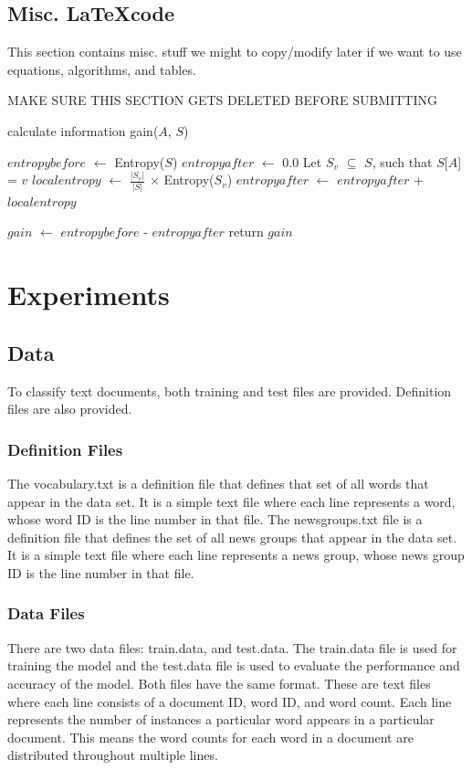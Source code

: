 \documentclass{IEEEtran}
\begin{document}
\subsection{Misc. \LaTeX code}
This section contains misc. stuff we might to copy/modify later if we want to use equations, algorithms, and tables.

MAKE SURE THIS SECTION GETS DELETED BEFORE SUBMITTING

\begin{algorithm}
\caption{calculate information gain($A$, $S$)}
\begin{algorithmic}
\Statex{}
\State $entropybefore$ $\leftarrow$ Entropy($S$)
\State $entropyafter$ $\leftarrow$ 0.0
  \State Let $S_v$ $\subseteq$ $S$, such that $S$[$A$] = $v$
  \State $localentropy$ $\leftarrow$ $\frac{|S_v|}{|S|}$ $\times$ Entropy($S_v$)
  \State $entropyafter$ $\leftarrow$ $entropyafter$ + $localentropy$
\EndFor

\State $gain$ $\leftarrow$ $entropybefore$ - $entropyafter$
\State return $gain$
\end{algorithmic}
\end{algorithm}


\section{Experiments}
\subsection{Data}
To classify text documents, both training and test files are provided. Definition files are also provided.

\subsubsection{Definition Files}
The vocabulary.txt is a definition file that defines that set of all words that appear in the data set. It is a simple text file where each line represents a word, whose word ID is the line number in that file. The newsgroups.txt file is a definition file that defines the set of all news groups that appear in the data set. It is a simple text file where each line represents a news group, whose news group ID is the line number in that file.

\subsubsection{Data Files}
There are two data files: train.data, and test.data. The train.data file is used for training the model and the test.data file is used to evaluate the performance and accuracy of the model. Both files have the same format. These are text files where each line consists of a document ID, word ID, and word count. Each line represents the number of instances a particular word appears in a particular document. This means the word counts for each word in a document are distributed throughout multiple lines.
\end{document}
